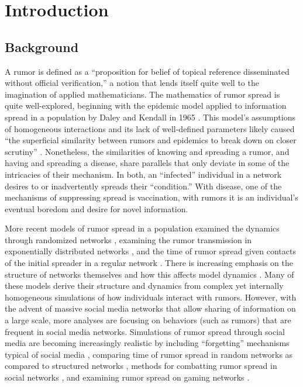\section{Introduction }
\label{sec:introduction}

\subsection{Background}
\label{subsec:background}

A rumor is defined as a ``proposition for belief of topical reference disseminated without official verification,'' \cite{knapp-1944} a notion that lends itself quite well to the imagination of applied mathematicians.
The mathematics of rumor spread is quite well-explored, beginning with the epidemic model applied to information spread in a population by Daley and Kendall in 1965 \cite{daley-1965}.
This model's assumptions of homogeneous interactions and its lack of well-defined parameters likely caused ``the superficial similarity between rumors and epidemics to break down on closer scrutiny'' \cite{daley-1965}.
Nonetheless, the similarities of knowing and spreading a rumor, and having and spreading a disease, share parallels that only deviate in some of the intricacies of their mechanism.
In both, an ``infected'' individual in a network desires to or inadvertently spreads their ``condition.''
With disease, one of the mechanisms of suppressing spread is vaccination, with rumors it is an individual's eventual boredom and desire for novel information.

More recent models of rumor spread in a population examined the dynamics through randomized networks \cite{karp-2000}, examining the rumor transmission in exponentially distributed networks \cite{moreno-2004}, and the time of rumor spread given contacts of the initial spreader in a regular network \cite{fount-2010}.
There is increasing emphasis on the structure of networks themselves and how this affects model dynamics \cite{zhang-2013, pellis-2015, pellis-2012, ball-2010, zhou-2007}.
Many of these models derive their structure and dynamics from complex yet internally homogeneous simulations of how individuals interact with rumors.
However, with the advent of massive social media networks that allow sharing of information on a large scale, more analyses are focusing on behaviors (such as rumors) that are frequent in social media networks.
Simulations of rumor spread through social media are becoming increasingly realistic by including ``forgetting'' mechanisms typical of social media \cite{zhao-2011}, comparing time of rumor spread in random networks as compared to structured networks \cite{liu-2011}, methods for combatting rumor spread in social networks \cite{tripathy-2010}, and examining rumor spread on gaming networks \cite{grab-2008}.

